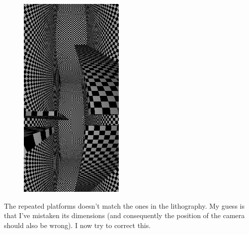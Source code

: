 \documentclass[12pt, a4paper]{article}
\begin{document}
\begin{center}
\begin{figure}[H]
\centering
\includegraphics[height=10cm]{./XL-51_6.png}\\
\end{figure}
\end{center}

The repeated platforms doesn't match the ones in the lithography. My guess is that I've mistaken its dimensions (and consequently the position of the camera should also be wrong). I now try to correct this.\\

\begin{scriptsize}
\begin{ttfamily}

\end{ttfamily}
\end{scriptsize}
\end{document}
